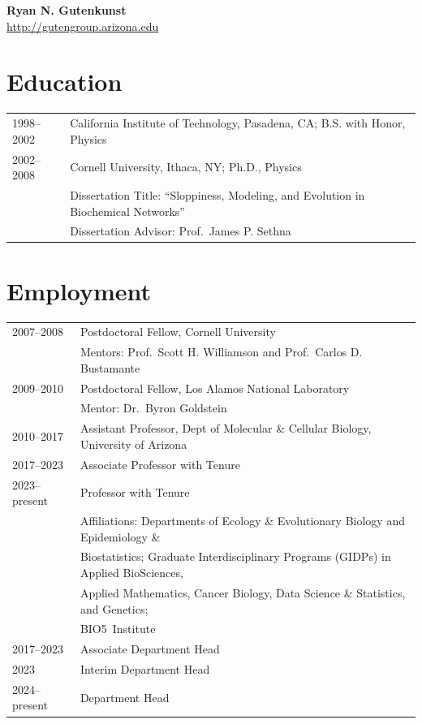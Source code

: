 \documentclass[11pt]{article}
\begin{document}
\begin{center}
\textbf{\Large Ryan N. Gutenkunst}\\
\url{http://gutengroup.arizona.edu}%
\end{center}

\section*{Education}
\begin{longtable}[l]{l l}
1998--2002 & California Institute of Technology, Pasadena, CA; B.S. with Honor, Physics\\
2002--2008 & Cornell University, Ithaca, NY; Ph.D., Physics\\
          & Dissertation Title: ``Sloppiness, Modeling, and Evolution in Biochemical Networks''\\
          & Dissertation Advisor: Prof.\ James P. Sethna
\end{longtable}

\section*{Employment}
\begin{longtable}[l]{l l}
2007--2008 & Postdoctoral Fellow, Cornell University\\%
          & Mentors: Prof.\ Scott H. Williamson and Prof.\ Carlos D. Bustamante\\
2009--2010 & Postdoctoral Fellow, Los Alamos National Laboratory\\%
          & Mentor: Dr.\ Byron Goldstein\\
2010--2017 & Assistant Professor, Dept of Molecular \& Cellular Biology, University of Arizona\\
2017--2023 & Associate Professor with Tenure\\
2023--present & Professor with Tenure\\
& Affiliations: Departments of Ecology \& Evolutionary Biology and Epidemiology \&\\
&Biostatistics; Graduate Interdisciplinary Programs (GIDPs) in Applied BioSciences,\\
&Applied Mathematics, Cancer Biology, Data Science \& Statistics, and Genetics;\\
&BIO5~Institute\\
2017--2023 & Associate Department Head\\
2023 & Interim Department Head\\
2024--present & Department Head\\
\end{longtable}
\end{document}
